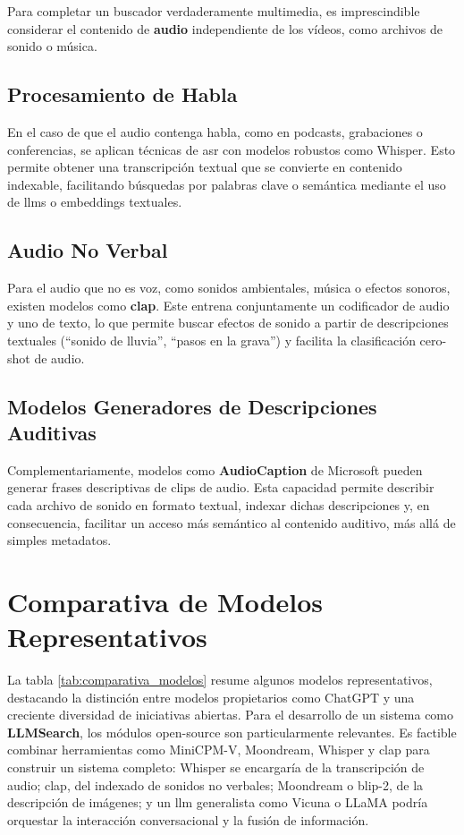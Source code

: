 Para completar un buscador verdaderamente multimedia, es imprescindible considerar el contenido de \textbf{audio} independiente de los vídeos, como archivos de sonido o música.

\subsection{Procesamiento de Habla}

En el caso de que el audio contenga habla, como en podcasts, grabaciones o conferencias, se aplican técnicas de \gls{asr} con modelos robustos como Whisper. Esto permite obtener una transcripción textual que se convierte en contenido indexable, facilitando búsquedas por palabras clave o semántica mediante el uso de \glspl{llm} o embeddings textuales.

\subsection{Audio No Verbal}

Para el audio que no es voz, como sonidos ambientales, música o efectos sonoros, existen modelos como \textbf{\gls{clap}}. Este entrena conjuntamente un codificador de audio y uno de texto, lo que permite buscar efectos de sonido a partir de descripciones textuales (``sonido de lluvia'', ``pasos en la grava'') y facilita la clasificación cero-shot de audio.

\subsection{Modelos Generadores de Descripciones Auditivas}

Complementariamente, modelos como \textbf{AudioCaption} de Microsoft pueden generar frases descriptivas de clips de audio. Esta capacidad permite describir cada archivo de sonido en formato textual, indexar dichas descripciones y, en consecuencia, facilitar un acceso más semántico al contenido auditivo, más allá de simples metadatos.

\section{Comparativa de Modelos Representativos}
\label{sec:comparativa}

La tabla \ref{tab:comparativa_modelos} resume algunos modelos representativos, destacando la distinción entre modelos propietarios como ChatGPT y una creciente diversidad de iniciativas abiertas. Para el desarrollo de un sistema como \textbf{LLMSearch}, los módulos open-source son particularmente relevantes. Es factible combinar herramientas como MiniCPM-V, Moondream, Whisper y \gls{clap} para construir un sistema completo: Whisper se encargaría de la transcripción de audio; \gls{clap}, del indexado de sonidos no verbales; Moondream o \gls{blip}-2, de la descripción de imágenes; y un \gls{llm} generalista como Vicuna o LLaMA podría orquestar la interacción conversacional y la fusión de información.

